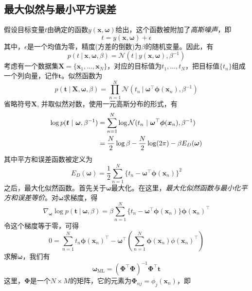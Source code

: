 \documentclass[11pt]{ctexbook}
\begin{document}
\subsection{最大似然与最小平方误差}
假设目标变量$t$由确定的函数$y(\bm x, \bm\omega)$给出，这个函数被附加了\emph{高斯噪声}，即
\begin{equation}
	t = y(\bm x, \bm \omega) + \epsilon
\end{equation}
其中，$\epsilon$是一个均值为零，精度(方差的倒数)为$\beta$的随机变量。因此，有
\begin{equation}
	p(t\ |\ \bm x,\bm \omega, \beta) = \mathcal N(t\ |\ y(\bm x, \bm \omega), \beta^{-1})
\end{equation}
考虑有一个数据集$\bm X = \{\bm x_1, \ldots, \bm x_N\}$，对应的目标值为$t_1, \ldots, t_N$，把目标值$\{t_n\}$组成一个列向量，记作$\bm t$。似然函数为
\begin{equation}
	p(\bm t\ |\ \bm X, \bm \omega, \beta) = \prod_{n=1}^{N}\mathcal N(t_n\ |\ \bm\omega^\top\bm\phi(\bm x_n), \beta^{-1})
\end{equation}
省略符号$\bm X$, 并取似然对数，使用一元高斯分布的形式，有
\begin{align}
	\log p(\bm t\ |\ \bm\omega, \beta^{-1}) &= \sum_{n=1}^{N}\log\mathcal N(t_n\ |\ \bm\omega^\top\bm\phi(\bm x_n), \beta^{-1}) \notag \\
	&= \frac{N}{2}\log\beta - \frac{N}{2}\log(2\pi)-\beta E_D(\bm \omega)
\end{align}
其中平方和误差函数被定义为
\begin{equation}
	E_D(\bm \omega) = \frac{1}{2}\sum_{n=1}^{N}\{t_n-\bm\omega^\top\bm\phi(\bm x_n) \}^2
\end{equation}
之后，最大化似然函数。首先关于$\bm \omega$最大化。在这里，\emph{最大化似然函数与最小化平方和误差等价}。对$\bm \omega$求梯度，得
\begin{equation}
	\nabla_{\bm\omega}\log p(\bm t\ |\ \bm\omega, \beta) = \beta\sum_{n=1}^{N}\{t_n-\bm\omega^\top\bm\phi(\bm x_n)\}\bm\phi(\bm x_n)^\top
\end{equation}
令这个梯度等于零，可得
\begin{equation}
	0 = \sum_{n=1}^{N}t_n\bm\phi(\bm x_n)^\top - \bm\omega^\top\left( \sum_{n=1}^{N}\bm\phi(\bm x_n)\phi(\bm x_n)^\top \right)
\end{equation}
求解$\bm\omega$，我们有
\begin{equation}
	\bm\omega_{\mathrm{ML}} = (\bm\Phi^\top\bm\Phi)^{-1}\bm\Phi^\top\bm t
\end{equation}
这里，$\bm\Phi$是一个$N\times M$的矩阵，它的元素为$\bm\Phi_{nj} = \phi_j(\bm x_n)$，即
\end{document}
